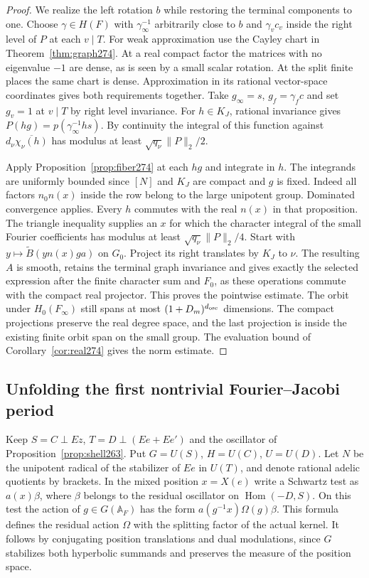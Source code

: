 \documentclass[a4paper,11pt]{article}
\theoremstyle{definition}
\theoremstyle{remark}
\numberwithin{equation}{section}
\begin{document}
\begin{proof}
We realize the left rotation \(b\) while restoring the
terminal components to one. Choose \(\gamma\in H(F)\)
with \(\gamma_\infty^{-1}\) arbitrarily close to \(b\)
and \(\gamma_v c_v\) inside the right level of \(P\) at
each \(v\mid T\). For weak approximation use the Cayley
chart in Theorem~\ref{thm:graph274}. At a real compact
factor the matrices with no eigenvalue \(-1\) are dense,
as is seen by a small scalar rotation. At the split finite
places the same chart is dense. Approximation in its
rational vector-space coordinates gives both requirements
together. Take \(g_\infty=s\), \(g_f=\gamma_f c\) and
set \(g_v=1\) at \(v\mid T\) by right level invariance.
For \(h\in K_J\), rational invariance gives
\(P(hg)=p(\gamma_\infty^{-1}hs)\). By continuity the integral
of this function against \(d_\nu\overline{\chi_\nu(h)}\)
has modulus at least \(\sqrt{q_\nu}\|P\|_2/2\).

Apply Proposition~\ref{prop:fiber274} at each \(hg\) and
integrate in \(h\). The integrands are uniformly bounded
since \([N]\) and \(K_J\) are compact and \(g\) is fixed.
Indeed all factors \(n_0 n(x)\) inside the row belong to
the large unipotent group. Dominated convergence applies.
Every \(h\) commutes with the real \(n(x)\) in that
proposition. The triangle inequality supplies an \(x\)
for which the character integral of the small Fourier
coefficients has modulus at least \(\sqrt{q_\nu}\|P\|_2/4\).
Start with \(y\mapsto\widetilde B(y n(x)g a)\) on \(G_0\).
Project its right translates by \(K_J\) to \(\nu\).
The resulting \(A\) is smooth, retains the terminal graph
invariance and gives exactly the selected expression after
the finite character sum and \(F_0\), as these operations
commute with the compact real projector. This proves the
pointwise estimate. The orbit under \(H_0(F_\infty)\)
still spans at most \((1+D_m)^{d_{\rm osc}}\) dimensions.
The compact projections preserve the real degree space, and
the last projection is inside the existing finite orbit
span on the small group. The evaluation bound of
Corollary~\ref{cor:real274} gives the norm estimate.
\end{proof}

\subsection{Unfolding the first nontrivial Fourier--Jacobi period}\label{nav:VIII-41}
Keep \(S=C\perp Ez\), \(T=D\perp(Ee+Ee')\) and the oscillator
of Proposition~\ref{prop:shell263}. Put \(G=U(S)\),
\(H=U(C)\), \(U=U(D)\). Let \(N\) be the unipotent radical of
the stabilizer of \(Ee\) in \(U(T)\), and denote rational adelic
quotients by brackets. In the mixed position \(x=X(e)\) write
a Schwartz test as \(a(x)\beta\), where \(\beta\) belongs
to the residual oscillator on \(\operatorname{Hom}(-D,S)\).
On this test the action of \(g\in G(\mathbb A_F)\) has the form
\(a(g^{-1}x)\Omega(g)\beta\). This formula defines the residual
action \(\Omega\) with the splitting factor of the actual kernel.
It follows by conjugating position translations and dual
modulations, since \(G\) stabilizes both hyperbolic summands
and preserves the measure of the position space.
\end{document}
